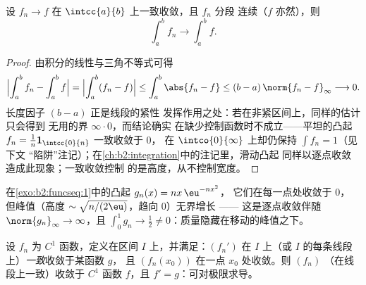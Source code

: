 \begin{theorem}[线段上的积分]\label{thm:b2:funcseq:integration}
设 $f_n \to f$ 在 $\intcc{a}{b}$ 上一致收敛，且 $f_n$ 分段
连续（$f$ 亦然），则
\[
\int_a^b f_n \longrightarrow \int_a^b f .
\]
\end{theorem}

\begin{proof}
由积分的线性与三角不等式可得
\[
\Bigl|\int_a^b f_n - \int_a^b f\Bigr|
= \Bigl|\int_a^b (f_n - f)\Bigr|
\leq \int_a^b\abs{f_n - f}
\leq (b - a)\,\norm{f_n - f}_\infty \longrightarrow 0 .
\]
长度因子 $(b - a)$ 正是线段的紧性
发挥作用之处：若在非紧区间上，同样的估计只会得到
无用的界 $\infty\cdot0$，而结论确实
在缺少控制函数时不成立——平坦的凸起 $f_n =
\frac1n\mathbf 1_{\intcc{0}{n}}$ 一致收敛于 $0$，
在 $\intco{0}{\infty}$ 上却仍保持 $\int f_n = 1$（见下文
“陷阱”注记）；在\cref{ch:b2:integration}中的注记里，滑动凸起
同样以逐点收敛造成此现象；一致收敛控制
的是高度，从不控制宽度。
\end{proof}

\begin{omfigure}

{\small 在\cref{exo:b2:funcseq:1}中的凸起 $g_n(x) = nx\,\eu^{-nx^2}$，
它们在每一点处收敛于 $0$，
但峰值（高度 $\sim\sqrt{n/(2\eu)}$，趋向
$0$）无界增长 —— 这是逐点收敛伴随
$\norm{g_n}_\infty \to \infty$，且 $\int_0^1 g_n \to \frac12
\neq 0$：质量隐藏在移动的峰值之下。}
\end{omfigure}

\begin{theorem}[求导]\label{thm:b2:funcseq:differentiation}
设 $f_n$ 为 $C^1$ 函数，定义在区间 $I$ 上，并满足：$(f_n')$
在 $I$ 上（或 $I$ 的每条线段上）\emph{一致}收敛于某函数 $g$，
且 $(f_n(x_0))$ 在一点 $x_0$ 处收敛。则 $(f_n)$
（在线段上一致）收敛于 $C^1$ 函数 $f$，且 $f'
= g$：可对极限求导。
\end{theorem}

